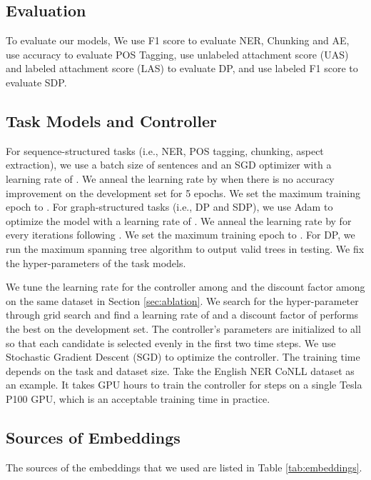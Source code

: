 \documentclass{article} \usepackage{iclr2021_conference,times}
\begin{document}
\subsection{Evaluation}
To evaluate our models, We use F1 score to evaluate NER, Chunking and AE, use accuracy to evaluate POS Tagging, use unlabeled attachment score (UAS) and labeled attachment score (LAS) to evaluate DP, and use labeled F1 score to evaluate SDP. 

\subsection{Task Models and Controller}
\label{sec:models}
For sequence-structured tasks (i.e., NER, POS tagging, chunking, aspect extraction), we use a batch size of  sentences and an SGD optimizer with a learning rate of . We anneal the learning rate by  when there is no accuracy improvement on the development set for 5 epochs. We set the maximum training epoch to . For graph-structured tasks (i.e., DP and SDP), we use Adam \citep{kingma2014adam} to optimize the model with a learning rate of . We anneal the learning rate by  for every  iterations following \citet{dozat2016deep}. We set the maximum training epoch to . For DP, we run the maximum spanning tree \cite{mcdonald-etal-2005-non} algorithm to output valid trees in testing. We fix the hyper-parameters of the task models. 

We tune the learning rate for the controller among  and the discount factor among  on the same dataset in Section \ref{sec:ablation}. We search for the hyper-parameter through grid search and find a learning rate of  and a discount factor of  performs the best on the development set. The controller's parameters are initialized to all  so that each candidate is selected evenly in the first two time steps. 
We use Stochastic Gradient Descent (SGD) to optimize the controller. 
The training time depends on the task and dataset size. Take the English NER CoNLL dataset as an example. It takes  GPU hours to train the controller for  steps on a single Tesla P100 GPU, which is an acceptable training time in practice.



\subsection{Sources of Embeddings}
\label{sec:embed}
The sources of the embeddings that we used are listed in Table \ref{tab:embeddings}. 
\end{document}
